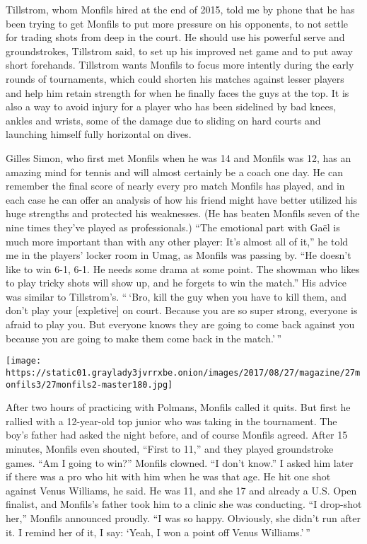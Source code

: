 Tillstrom, whom Monfils hired at the end of 2015, told me by phone that
he has been trying to get Monfils to put more pressure on his opponents,
to not settle for trading shots from deep in the court. He should use
his powerful serve and groundstrokes, Tillstrom said, to set up his
improved net game and to put away short forehands. Tillstrom wants
Monfils to focus more intently during the early rounds of tournaments,
which could shorten his matches against lesser players and help him
retain strength for when he finally faces the guys at the top. It is
also a way to avoid injury for a player who has been sidelined by bad
knees, ankles and wrists, some of the damage due to sliding on hard
courts and launching himself fully horizontal on dives.

Gilles Simon, who first met Monfils when he was 14 and Monfils was 12,
has an amazing mind for tennis and will almost certainly be a coach one
day. He can remember the final score of nearly every pro match Monfils
has played, and in each case he can offer an analysis of how his friend
might have better utilized his huge strengths and protected his
weaknesses. (He has beaten Monfils seven of the nine times they've
played as professionals.) ``The emotional part with Gaël is much more
important than with any other player: It's almost all of it,'' he told
me in the players' locker room in Umag, as Monfils was passing by. ``He
doesn't like to win 6-1, 6-1. He needs some drama at some point. The
showman who likes to play tricky shots will show up, and he forgets to
win the match.'' His advice was similar to Tillstrom's. `` `Bro, kill
the guy when you have to kill them, and don't play your {[}expletive{]}
on court. Because you are so super strong, everyone is afraid to play
you. But everyone knows they are going to come back against you because
you are going to make them come back in the match.' ''

\texttt{[image: https://static01.graylady3jvrrxbe.onion/images/2017/08/27/magazine/27monfils3/27monfils2-master180.jpg]}

After two hours of practicing with Polmans, Monfils called it quits. But
first he rallied with a 12-year-old top junior who was taking in the
tournament. The boy's father had asked the night before, and of course
Monfils agreed. After 15 minutes, Monfils even shouted, ``First to 11,''
and they played groundstroke games. ``Am I going to win?'' Monfils
clowned. ``I don't know.'' I asked him later if there was a pro who hit
with him when he was that age. He hit one shot against Venus Williams,
he said. He was 11, and she 17 and already a U.S. Open finalist, and
Monfils's father took him to a clinic she was conducting. ``I drop-shot
her,'' Monfils announced proudly. ``I was so happy. Obviously, she
didn't run after it. I remind her of it, I say: `Yeah, I won a point off
Venus Williams.' ''


